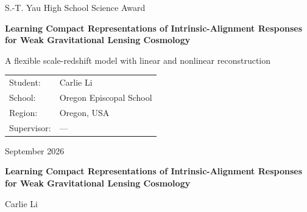 \documentclass[11pt,a4paper]{article}
\newcommand{\projecttitle}{Learning Compact Representations of Intrinsic-Alignment Responses for Weak Gravitational Lensing Cosmology}
\newcommand{\projectsubtitle}{A flexible scale-redshift model with linear and nonlinear reconstruction}
\newcommand{\studentname}{Carlie Li}
\newcommand{\schoolname}{Oregon Episcopal School}
\newcommand{\schoolregion}{Oregon, USA}
\newcommand{\supervisorname}{---}
\newcommand{\reportdate}{September 2026}
\begin{document}
\begin{titlepage}
  \thispagestyle{empty}
  \centering
  \vspace*{0.15\textheight}
  {\Large S.-T. Yau High School Science Award\par}
  \vspace{2.5cm}
  {\huge\bfseries \projecttitle\par}
  \vspace{0.6cm}
  {\Large \projectsubtitle\par}
  \vfill
  \begin{tabular}{@{}ll@{}}
    Student: & \studentname \\
    School: & \schoolname \\
    Region: & \schoolregion \\
    Supervisor: & \supervisorname \\
  \end{tabular}
  \vfill
  {\large\reportdate\par}
\end{titlepage}

\begin{center}
  {\Large\bfseries \projecttitle\par}
  \vspace{0.7em}
  {\normalsize \studentname\par}
\end{center}
\vspace{0.5em}
\end{document}
